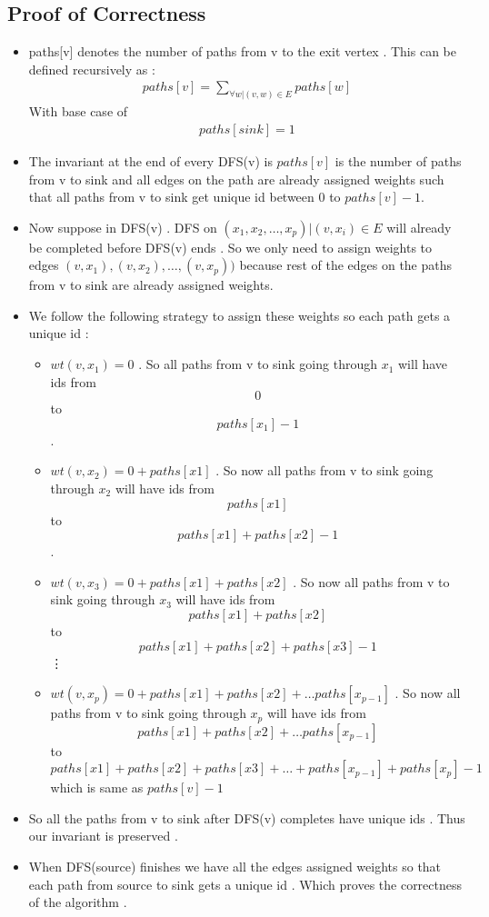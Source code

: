 \documentclass[11pt]{article}
\begin{document}
\subsection*{Proof of Correctness}
\begin{itemize}
\item paths[v] denotes the number of paths from v to the exit vertex . This can be defined recursively as :
\begin{align*}
paths[v] = \sum_{\forall w | (v,w) \in E}{paths[w]}
\end{align*}
With base case of 
\begin{align*}
paths[sink] = 1
\end{align*}
\item The invariant at the end of every DFS(v) is $paths[v]$ is the number of paths from v to sink and all edges on the path are already assigned weights such that all paths from v to sink get unique id between 0 to $paths[v]-1$. 
\item Now suppose in DFS(v) . DFS on $(x_1,x_2,\ldots,x_p)|(v,x_i)\in E$ will already be completed before DFS(v) ends . So we only need to assign weights to edges $(v,x_1),(v,x_2),\ldots,(v,x_p))$ because rest of the edges on the paths from v to sink are already assigned weights. 
\item We follow the following strategy to assign these weights so each path gets a unique id :
\begin{itemize}
\item $wt(v,x_1) = 0$ . So all paths from v to sink going through $x_1$ will have ids from \[0\] to \[paths[x_1]-1\].
\item $wt(v,x_2) = 0 + paths[x1]$ . So now all  paths from v to sink going through $x_2$ will have ids from \[paths[x1]\] to \[paths[x1] + paths[x2] -1\] .
\item $wt(v,x_3) = 0 + paths[x1] + paths[x2]$ . So now all  paths from v to sink going through $x_3$ will have ids from \[paths[x1] + paths[x2]\] to \[paths[x1] + paths[x2]  + paths[x3]-1\]
\vdots 
\item $wt(v,x_p) = 0 + paths[x1] + paths[x2] + \ldots paths[x_{p-1}]$ . So now all  paths from v to sink going through $x_p$ will have ids from \[paths[x1] + paths[x2] + \ldots paths[x_{p-1}]\] to \[paths[x1] + paths[x2]  + paths[x3]+ \ldots +paths[x_{p-1}] + paths[x_p]-1 \] which is same as $ paths[v] -1$ 

\end{itemize}
\item So all the paths from v to sink after DFS(v) completes have unique ids . Thus our invariant is preserved . 
\item When DFS(source) finishes we have all the edges assigned weights so that each path from source to sink gets a unique id . Which proves the correctness of the algorithm . 
\end{itemize}
\pagebreak
\end{document}
